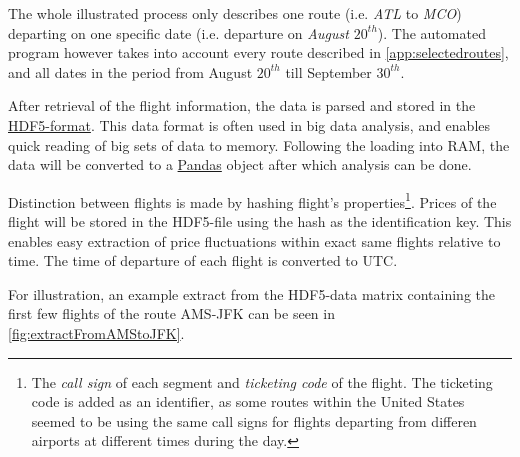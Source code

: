 The whole illustrated process only describes one route (i.e. \emph{ATL} to \emph{MCO}) departing on one specific date (i.e. departure on \emph{August $20^{th}$}). The automated program however takes into account every route described in \autoref{app:selectedroutes}, and all dates in the period from August $20^{th}$ till September $30^{th}$.

After retrieval of the flight information, the data is parsed and stored in the \href{http://www.hdfgroup.org/HDF5/}{HDF5-format}. This data format is often used in big data analysis, and enables quick reading of big sets of data to memory. Following the loading into RAM, the data will be converted to a \href{http://pandas.pydata.org/}{Pandas} object after which analysis can be done.

Distinction between flights is made by hashing flight's  properties\footnote{The \emph{call sign} of each segment and \emph{ticketing code} of the flight. The ticketing code is added as an identifier, as some routes within the United States seemed to be using the same call signs for flights departing from differen airports at different times during the day.}. Prices of the flight will be stored in the HDF5-file using the hash as the identification key. This enables easy extraction of price fluctuations within exact same flights relative to time. The time of departure of each flight is converted to UTC.

For illustration, an example extract from the HDF5-data matrix containing the first few flights of the route AMS-JFK can be seen in \autoref{fig:extractFromAMStoJFK}.

